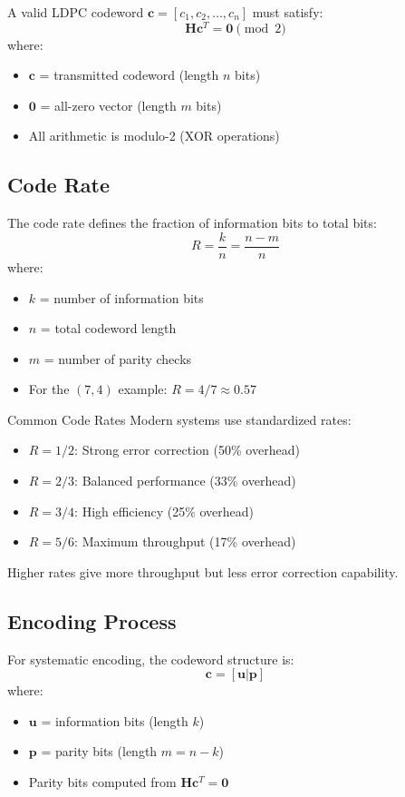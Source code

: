 A valid LDPC codeword $\mathbf{c} = [c_1, c_2, \ldots, c_n]$ must satisfy:
\begin{equation}
\mathbf{H} \mathbf{c}^T = \mathbf{0} \pmod{2}
\end{equation}
where:
\begin{itemize}
\item $\mathbf{c}$ = transmitted codeword (length $n$ bits)
\item $\mathbf{0}$ = all-zero vector (length $m$ bits)
\item All arithmetic is modulo-2 (XOR operations)
\end{itemize}

\subsection{Code Rate}

The code rate defines the fraction of information bits to total bits:
\begin{equation}
R = \frac{k}{n} = \frac{n - m}{n}
\end{equation}
where:
\begin{itemize}
\item $k$ = number of information bits
\item $n$ = total codeword length
\item $m$ = number of parity checks
\item For the $(7,4)$ example: $R = 4/7 \approx 0.57$
\end{itemize}

\begin{calloutbox}{Common Code Rates}
Modern systems use standardized rates:
\begin{itemize}
\item $R = 1/2$: Strong error correction (50\% overhead)
\item $R = 2/3$: Balanced performance (33\% overhead)
\item $R = 3/4$: High efficiency (25\% overhead)
\item $R = 5/6$: Maximum throughput (17\% overhead)
\end{itemize}
Higher rates give more throughput but less error correction capability.
\end{calloutbox}

\subsection{Encoding Process}

For systematic encoding, the codeword structure is:
\begin{equation}
\mathbf{c} = [\mathbf{u} | \mathbf{p}]
\end{equation}
where:
\begin{itemize}
\item $\mathbf{u}$ = information bits (length $k$)
\item $\mathbf{p}$ = parity bits (length $m = n - k$)
\item Parity bits computed from $\mathbf{H}\mathbf{c}^T = \mathbf{0}$
\end{itemize}


